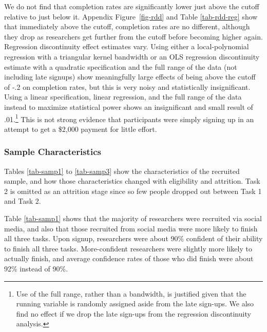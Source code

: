 \documentclass[
  letterpaper,
  DIV=11,
  numbers=noendperiod]{scrartcl}
\begin{document}
We do not find that completion rates are significantly lower just above
the cutoff relative to just below it. Appendix Figure~\ref{fig-rdd} and
Table \ref{tab-rdd-reg} show that immediately above the cutoff,
completion rates are no different, although they drop as researchers get
further from the cutoff before becoming higher again. Regression
discontinuity effect estimates vary. Using either a local-polynomial
regression with a triangular kernel bandwidth or an OLS regression
discontinuity estimate with a quadratic specification and the full range
of the data (not including late signups) show meaningfully large effects
of being above the cutoff of -.2 on completion rates, but this is very
noisy and statistically insignificant. Using a linear specification,
linear regression, and the full range of the data instead to maximize
statistical power shows an insignificant and small result of
.01.\footnote{Use of the full range, rather than a bandwidth, is
  justified given that the running variable is randomly assigned aside
  from the late sign-ups. We also find no effect if we drop the late
  sign-ups from the regression discontinuity analysis.} This is not
strong evidence that participants were simply signing up in an attempt
to get a \$2,000 payment for little effort.

\subsubsection{Sample Characteristics}\label{sec-sample-characteristics}

Tables \ref{tab-samp1} to \ref{tab-samp3} show the characteristics of
the recruited sample, and how those characteristics changed with
eligibility and attrition. Task 2 is omitted as an attrition stage since
so few people dropped out between Task 1 and Task 2.

Table \ref{tab-samp1} shows that the majority of researchers were
recruited via social media, and also that those recruited from social
media were more likely to finish all three tasks. Upon signup,
researchers were about 90\% confident of their ability to finish all
three tasks. More-confident researchers were slightly more likely to
actually finish, and average confidence rates of those who did finish
were about 92\% instead of 90\%.
\end{document}
